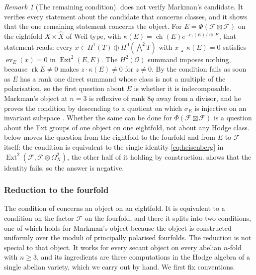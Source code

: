 \documentclass[11pt,reqno]{amsart}
\theoremstyle{plain}
\theoremstyle{definition}
\theoremstyle{remark}
\newtheorem{remark}[theorem]{Remark}
\newcommand{\cF}{\mathcal{F}}
\newcommand{\cO}{\mathcal{O}}
\DeclareMathOperator{\ch}{ch}
\DeclareMathOperator{\Ext}{Ext}
\begin{document}
\begin{remark}[The remaining condition]\label{rem:onecondition}
 does not verify Markman's candidate. It verifies every
statement about the candidate that concerns classes, and it shows that the
one remaining statement concerns the object. For
$E=\Phi(\cF\boxtimes\cF)$ on the eightfold $X\times\widehat X$ of Weil type,
with $\kappa(E)=\ch(E)e^{-c_{1}(E)/\operatorname{rk}E}$, that statement reads:
every $x\in H^{1}(T)\oplus H^{0}(\bigwedge^{2}T)$ with
$x\lrcorner\,\kappa(E)=0$ satisfies $\operatorname{ev}_{E}(x)=0$ in
$\Ext^{2}(E,E)$. The $H^{2}(\cO)$ summand imposes nothing, because
$\operatorname{rk}E\ne0$ makes $z\cdot\kappa(E)\ne0$ for $z\ne0$. By
\cite[Theorem~9.20]{paperI} the condition fails as soon as $E$ has a rank one
direct summand whose class is not a multiple of the polarisation, so the
first question about $E$ is whether it is indecomposable. Markman's object
at $n=3$ is reflexive of rank $8q$ away from a divisor, and he proves the
condition by descending to a quotient on which $\sigma_{E}$ is injective on
an invariant subspace \cite[Proposition 11.5]{Mar25b}. Whether the same can
be done for $\Phi(\cF\boxtimes\cF)$ is a question about the Ext groups of one
object on one eightfold, not about any Hodge class.  below
moves the question from the eightfold to the fourfold and from $E$ to $\cF$
itself: the condition is equivalent to the single identity
\eqref{eq:heisenberg} in $\Ext^{2}(\cF,\cF\otimes\Omega^{2}_{X})$, the other
half of it holding by construction.  shows that the
identity fails, so the answer is negative.
\end{remark}

\subsubsection*{Reduction to the fourfold}

The condition of  concerns an object on an eightfold.
It is equivalent to a condition on the factor $\cF$ on the fourfold, and
there it splits into two conditions, one of which holds for Markman's object
because the object is constructed uniformly over the moduli of principally
polarised fourfolds. The reduction is not special to that object. It works
for every secant object on every abelian $n$-fold with $n\ge3$, and its
ingredients are three computations in the Hodge algebra of a single abelian
variety, which we carry out by hand. We first fix
conventions.
\end{document}
